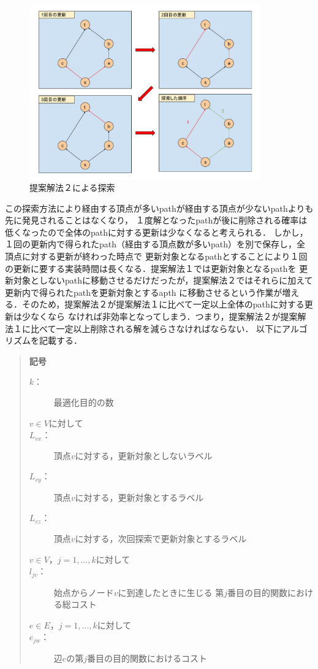 \documentclass[12pt]{optlab-bachelor}
\begin{document}
\begin{figure}[htbp]
  \centering
  \caption{提案解法２による探索}
  \includegraphics[width=10.0cm]{fig/fig7.pdf}
\end{figure}

この探索方法により経由する頂点が多いpathが経由する頂点が少ないpathよりも先に発見されることはなくなり，
１度解となったpathが後に削除される確率は低くなったので全体のpathに対する更新は少なくなると考えられる．
しかし，１回の更新内で得られたpath（経由する頂点数が多いpath）を別で保存し，全頂点に対する更新が終わった時点で
更新対象となるpathとすることにより１回の更新に要する実装時間は長くなる．提案解法１では更新対象となるpathを
更新対象としないpathに移動させるだけだったが，提案解法２ではそれらに加えて更新内で得られたpathを更新対象とするapth
に移動させるという作業が増える．そのため，提案解法２が提案解法１に比べて一定以上全体のpathに対する更新は少なくなら
なければ非効率となってしまう．つまり，提案解法２が提案解法１に比べて一定以上削除される解を減らさなければならない．
以下にアルゴリズムを記載する．

\begin{quote}
  \textbf{記号}
  \begin{description}
    \item[$k$：] 最適化目的の数
    \item[$v \in V$に対して]
    \item[$L_{vx}$：] 頂点$v$に対する，更新対象としないラベル
    \item[$L_{vy}$：] 頂点$v$に対する，更新対象とするラベル
    \item[$L_{vz}$：] 頂点$v$に対する，次回探索で更新対象とするラベル
    \item[$v \in V$，$j = 1 , \ldots , k$に対して]
    \item[$l_{jv}$：] 始点からノード$v$に到達したときに生じる
    第$j$番目の目的関数における総コスト
    \item[$e \in E$，$j = 1 , \ldots , k$に対して]
    \item[$e_{jw}$：] 辺$e$の第$j$番目の目的関数におけるコスト
  \end{description}
\end{quote}
\end{document}
